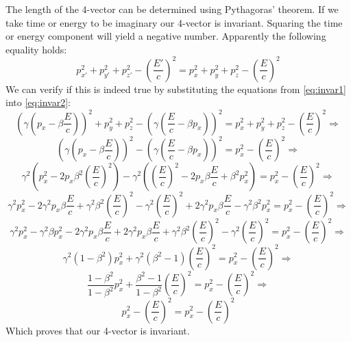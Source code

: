 The length of the 4-vector can be determined using Pythagoras' theorem. If we take time or energy to be imaginary our 4-vector is invariant. Squaring the time or energy component will yield a negative number. Apparently the following equality holds:
\begin{equation}\label{eq:invar2}
p^2_{x'} + p^2_{y'} + p^2_{z'} - \left( \frac{E'}{c} \right)^2 = p^2_{x} + p^2_{y} + p^2_{z} - \left( \frac{E}{c} \right)^2
\end{equation}
We can verify if this is indeed true by substituting the equations from \ref{eq:invar1} into \ref{eq:invar2}:
\begin{equation}\label{eq:invar3}
\left( \gamma \left( p_x - \beta \frac{E}{c} \right)\right) ^2 + p^2_{y} + p^2_{z} - \left( \gamma \left( \frac{E}{c} - \beta p_x \right) \right)^2  = p^2_{x} + p^2_{y} + p^2_{z} - \left( \frac{E}{c} \right)^2 \Longrightarrow
\end{equation}
\begin{equation}\label{eq:invar4}
\left( \gamma \left( p_x - \beta \frac{E}{c} \right)\right) ^2 - \left( \gamma \left( \frac{E}{c} - \beta p_x \right) \right)^2  = p^2_{x} - \left( \frac{E}{c} \right)^2 \Longrightarrow
\end{equation}
\begin{equation}\label{eq:invar5}
\gamma^2 \left( p^2_x - 2p_x \beta^2 \left( \frac{E}{c}\right)^2\right)  - \gamma^2 \left( \left( \frac{E}{c}\right)^2 -2p_x\beta\frac{E}{c} +\beta^2 p^2_x\right) = p^2_x-\left( \frac{E}{c}\right)^2 \Longrightarrow
\end{equation}
\begin{equation}\label{eq:invar6}
\gamma^2 p^2_x -2\gamma^2 p_x \beta \frac{E}{c} + \gamma^2 \beta^2 \left( \frac{E}{c}\right)^2 - \gamma^2\left( \frac{E}{c} \right)^2 + 2\gamma^2 p_x \beta \frac{E}{c} - \gamma^2 \beta^2 p^2_x =p^2_x-\left( \frac{E}{c}\right)^2 \Longrightarrow
\end{equation}
\begin{equation}\label{eq:invar7}
\gamma^2 p^2_x - \gamma^2 \beta p^2_x - 2\gamma^2 p_x \beta \frac{E}{c} + 2\gamma^2 p_x \beta \frac{E}{c} + \gamma^2 \beta^2 \left( \frac{E}{c}\right)^2 - \gamma^2 \left( \frac{E}{c}\right)^2 =p^2_x-\left( \frac{E}{c}\right)^2 \Longrightarrow
\end{equation}
\begin{equation}\label{eq:invar8}
\gamma^2 \left( 1-\beta^2\right) p^2_x + \gamma^2\left( \beta^2 -1\right) \left(\frac{E}{c} \right)^2 =p^2_x-\left( \frac{E}{c}\right)^2 \Longrightarrow
\end{equation}
\begin{equation}\label{eq:invar9}
\frac{1-\beta^2}{1-\beta^2} p^2_x + \frac{\beta^2 -1}{1-\beta^2}\left(\frac{E}{c} \right)^2 =p^2_x-\left( \frac{E}{c}\right)^2 \Longrightarrow
\end{equation}
\begin{equation}\label{eq:invar10}
p^2_x-\left( \frac{E}{c}\right)^2 =p^2_x-\left( \frac{E}{c}\right)^2 
\end{equation}
Which proves that our 4-vector is invariant.

